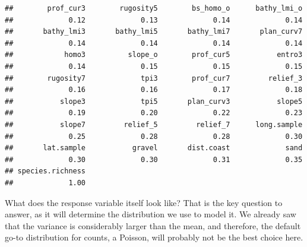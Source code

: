 \documentclass[
]{book}
\newenvironment{Shaded}{\begin{snugshade}}{\end{snugshade}}
\newcommand{\AttributeTok}[1]{\textcolor[rgb]{0.77,0.63,0.00}{#1}}
\newcommand{\DecValTok}[1]{\textcolor[rgb]{0.00,0.00,0.81}{#1}}
\newcommand{\FunctionTok}[1]{\textcolor[rgb]{0.00,0.00,0.00}{#1}}
\newcommand{\NormalTok}[1]{#1}
\newcommand{\SpecialCharTok}[1]{\textcolor[rgb]{0.00,0.00,0.00}{#1}}
\newcommand{\StringTok}[1]{\textcolor[rgb]{0.31,0.60,0.02}{#1}}
\begin{document}
\begin{verbatim}
##        prof_cur3        rugosity5        bs_homo_o      bathy_lmi_o 
##             0.12             0.13             0.14             0.14 
##       bathy_lmi3       bathy_lmi5       bathy_lmi7       plan_curv7 
##             0.14             0.14             0.14             0.14 
##            homo3          slope_o        prof_cur5           entro3 
##             0.14             0.15             0.15             0.15 
##        rugosity7             tpi3        prof_cur7         relief_3 
##             0.16             0.16             0.17             0.18 
##           slope3             tpi5       plan_curv3           slope5 
##             0.19             0.20             0.22             0.23 
##           slope7         relief_5         relief_7      long.sample 
##             0.25             0.28             0.28             0.30 
##       lat.sample           gravel       dist.coast             sand 
##             0.30             0.30             0.31             0.35 
## species.richness 
##             1.00
\end{verbatim}

What does the response variable itself look like? That is the key question to answer, as it will determine the distribution we use to model it. We already saw that the variance is considerably larger than the mean, and therefore, the default go-to distribution for counts, a Poisson, will probably not be the best choice here.

\begin{Shaded}
\end{Shaded}
\end{document}
